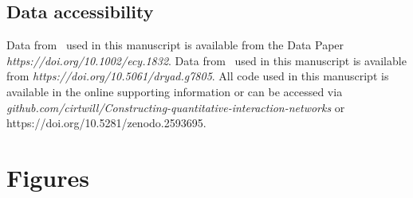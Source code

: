 \documentclass[12pt]{article}
\begin{document}
\begin{spacing}{1.5}
\section*{Data accessibility}

Data from~\citet{Kopelke2017} used in this manuscript is available from the Data Paper \emph{https://doi.org/10.1002/ecy.1832}. Data from~\citet{Barbour2016} used in this manuscript is available from \emph{https://doi.org/10.5061/dryad.g7805}. All code used in this manuscript is available in the online supporting information or can be accessed via \emph{github.com/cirtwill/Constructing-quantitative-interaction-networks} or https://doi.org/10.5281/zenodo.2593695.



\end{spacing}
\clearpage


\section*{Figures}
\end{document}

